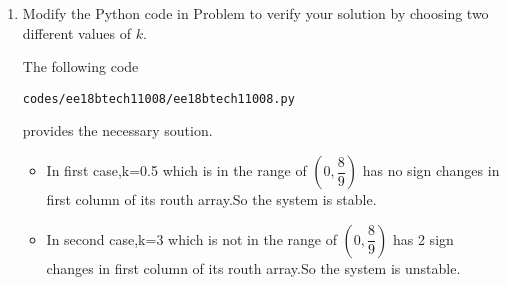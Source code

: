 \begin{enumerate}[label=\thesubsection.\arabic*.,ref=\thesubsection.\theenumi]
\item Modify the Python code in Problem to verify your solution by choosing two different values of $k$.
\label{prob:ee18btech11008_python}

\solution 
The following code 
%
\begin{lstlisting}
codes/ee18btech11008/ee18btech11008.py
\end{lstlisting}
%
provides the necessary soution.
\begin{itemize}
  \item In first case,k=0.5 which is in the range of $(0,\dfrac{8}{9})$ has no sign changes in first column of its routh array.So the system is stable.
  \item In second case,k=3 which is not in the range of $(0,\dfrac{8}{9})$ has 2 sign changes in first column of its routh array.So the system is unstable.
  \end{itemize}
\end{enumerate}

